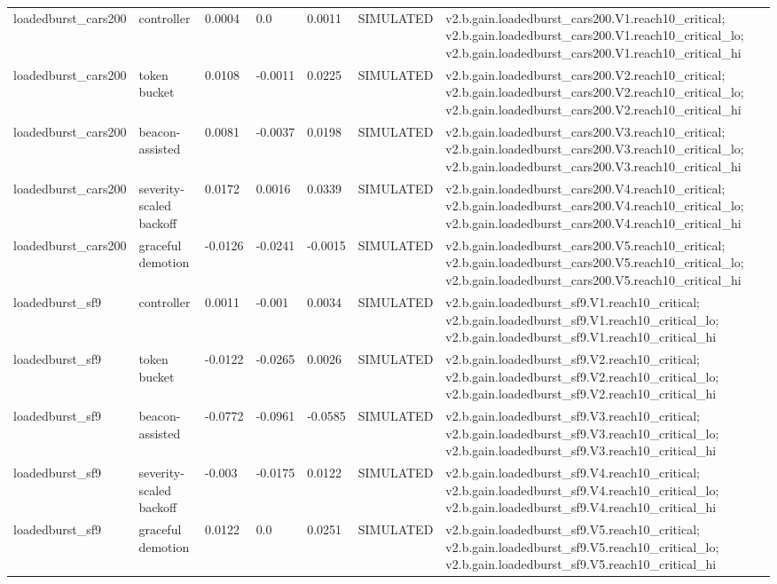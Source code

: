 \begin{table}[t]
\begin{tabular}{lllllll}
loadedburst\_cars200 & controller & 0.0004 & 0.0 & 0.0011 & SIMULATED & v2.b.gain.loadedburst\_cars200.V1.reach10\_critical; v2.b.gain.loadedburst\_cars200.V1.reach10\_critical\_lo; v2.b.gain.loadedburst\_cars200.V1.reach10\_critical\_hi \\
loadedburst\_cars200 & token bucket & 0.0108 & -0.0011 & 0.0225 & SIMULATED & v2.b.gain.loadedburst\_cars200.V2.reach10\_critical; v2.b.gain.loadedburst\_cars200.V2.reach10\_critical\_lo; v2.b.gain.loadedburst\_cars200.V2.reach10\_critical\_hi \\
loadedburst\_cars200 & beacon-assisted & 0.0081 & -0.0037 & 0.0198 & SIMULATED & v2.b.gain.loadedburst\_cars200.V3.reach10\_critical; v2.b.gain.loadedburst\_cars200.V3.reach10\_critical\_lo; v2.b.gain.loadedburst\_cars200.V3.reach10\_critical\_hi \\
loadedburst\_cars200 & severity-scaled backoff & 0.0172 & 0.0016 & 0.0339 & SIMULATED & v2.b.gain.loadedburst\_cars200.V4.reach10\_critical; v2.b.gain.loadedburst\_cars200.V4.reach10\_critical\_lo; v2.b.gain.loadedburst\_cars200.V4.reach10\_critical\_hi \\
loadedburst\_cars200 & graceful demotion & -0.0126 & -0.0241 & -0.0015 & SIMULATED & v2.b.gain.loadedburst\_cars200.V5.reach10\_critical; v2.b.gain.loadedburst\_cars200.V5.reach10\_critical\_lo; v2.b.gain.loadedburst\_cars200.V5.reach10\_critical\_hi \\
loadedburst\_sf9 & controller & 0.0011 & -0.001 & 0.0034 & SIMULATED & v2.b.gain.loadedburst\_sf9.V1.reach10\_critical; v2.b.gain.loadedburst\_sf9.V1.reach10\_critical\_lo; v2.b.gain.loadedburst\_sf9.V1.reach10\_critical\_hi \\
loadedburst\_sf9 & token bucket & -0.0122 & -0.0265 & 0.0026 & SIMULATED & v2.b.gain.loadedburst\_sf9.V2.reach10\_critical; v2.b.gain.loadedburst\_sf9.V2.reach10\_critical\_lo; v2.b.gain.loadedburst\_sf9.V2.reach10\_critical\_hi \\
loadedburst\_sf9 & beacon-assisted & -0.0772 & -0.0961 & -0.0585 & SIMULATED & v2.b.gain.loadedburst\_sf9.V3.reach10\_critical; v2.b.gain.loadedburst\_sf9.V3.reach10\_critical\_lo; v2.b.gain.loadedburst\_sf9.V3.reach10\_critical\_hi \\
loadedburst\_sf9 & severity-scaled backoff & -0.003 & -0.0175 & 0.0122 & SIMULATED & v2.b.gain.loadedburst\_sf9.V4.reach10\_critical; v2.b.gain.loadedburst\_sf9.V4.reach10\_critical\_lo; v2.b.gain.loadedburst\_sf9.V4.reach10\_critical\_hi \\
loadedburst\_sf9 & graceful demotion & 0.0122 & 0.0 & 0.0251 & SIMULATED & v2.b.gain.loadedburst\_sf9.V5.reach10\_critical; v2.b.gain.loadedburst\_sf9.V5.reach10\_critical\_lo; v2.b.gain.loadedburst\_sf9.V5.reach10\_critical\_hi \\

\end{tabular}
\end{table}
